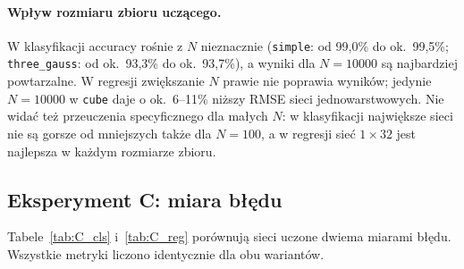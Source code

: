 \documentclass[11pt,a4paper]{article}
\begin{document}
	\paragraph{Wpływ rozmiaru zbioru uczącego.} W klasyfikacji accuracy rośnie z $N$ nieznacznie (\texttt{simple}: od 99,0\% do ok.\ 99,5\%; \texttt{three\_gauss}: od ok.\ 93,3\% do ok.\ 93,7\%), a wyniki dla $N=10000$ są najbardziej powtarzalne. W regresji zwiększanie $N$ prawie nie poprawia wyników; jedynie $N=10000$ w \texttt{cube} daje o ok.\ 6--11\% niższy RMSE sieci jednowarstwowych. Nie widać też przeuczenia specyficznego dla małych $N$: w klasyfikacji największe sieci nie są gorsze od mniejszych także dla $N=100$, a w regresji sieć $1\times32$ jest najlepsza w każdym rozmiarze zbioru.
	
	\subsection{Eksperyment C: miara błędu}
	Tabele~\ref{tab:C_cls} i~\ref{tab:C_reg} porównują sieci uczone dwiema miarami błędu. Wszystkie metryki liczono identycznie dla obu wariantów.
	
\end{document}
